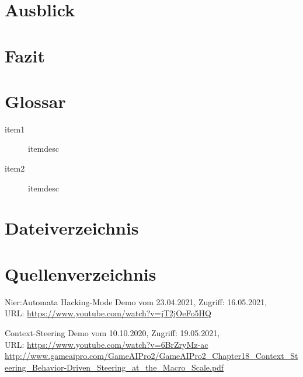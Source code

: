 \documentclass[a4paper,10pt,ngerman,fontsize=12pt]{scrreprt}
\begin{document}
\lipsum[3]





\chapter{Ausblick}

\lipsum[3]





\chapter{Fazit}

\lipsum[3]





\chapter{Glossar}

\begin{description}
\item[item1] itemdesc
\item[item2] itemdesc
\end{description}




\chapter{Dateiverzeichnis}




\chapter{Quellenverzeichnis}

\begin{thebibliography}{999}

 Nier:Automata Hacking-Mode Demo vom 23.04.2021,  Zugriff:  16.05.2021, \\ URL:
\url{https://www.youtube.com/watch?v=jT2jOeFo5HQ}

 Context-Steering Demo vom 10.10.2020,  Zugriff:  19.05.2021, \\ URL:
\url{https://www.youtube.com/watch?v=6BrZryMz-ac}
\url{http://www.gameaipro.com/GameAIPro2/GameAIPro2_Chapter18_Context_Steering_Behavior-Driven_Steering_at_the_Macro_Scale.pdf}

\end{thebibliography}
    
\end{document}
